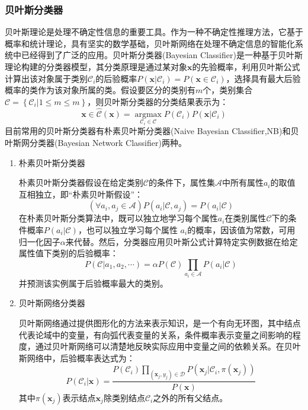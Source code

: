 \documentclass[a4paper]{ctexart}
\begin{document}
\subsubsection{贝叶斯分类器}
贝叶斯理论是处理不确定性信息的重要工具。作为一种不确定性推理方法，它基于概率和统计理论，具有坚实的数学基础，贝叶斯网络在处理不确定信息的智能化系统中已经得到了广泛的应用。贝叶斯分类器(Bayesian Classifier)是一种基于贝叶斯理论构建的分类器模型，其分类原理是通过某对象$\bm x$的先验概率，利用贝叶斯公式计算出该对象属于类别$\mathcal C_i$的后验概率$P(\bm x|\mathcal C_i)=P(\bm x\in \mathcal C_i)$，选择具有最大后验概率的类作为该对象所属的类\cite{RN199}。假设要区分的类别有$m$个，类别集合$\mathcal C=\left\{\mathcal C_i|1\leq m\leq m\right\}$，则贝叶斯分类器的分类结果表示为：
\begin{equation}
	\bm x\in \hat{\mathcal C}(\bm x)=\mathop{argmax}\limits_{\mathcal C_i\in \mathcal C}P(\mathcal C_i)P(\bm x|\mathcal C_i)
\end{equation}
目前常用的贝叶斯分类器有朴素贝叶斯分类器(Naive Bayesian Classifier,NB)和贝叶斯网分类器(Bayesian Network Classifier)两种。
\begin{enumerate}
	\item 朴素贝叶斯分类器

	      朴素贝叶斯分类器假设在给定类别$\mathcal C$的条件下，属性集$\mathcal A$中所有属性$a_i$的取值互相独立，即“朴素贝叶斯假设”\cite{RN200}：
	      \begin{equation}
		      (\forall a_i,a_j\in \mathcal A)P(a_i|\mathcal C,a_j)=P(a_i|\mathcal C)
	      \end{equation}
	      在朴素贝叶斯分类算法中，既可以独立地学习每个属性$a_i$在类别属性$\mathcal C$下的条件概率$P(a_i|\mathcal C)$，也可以独立学习每个属性 $a_i$的概率，因该值为常数，可用归一化因子$\alpha$来代替。然后，分类器应用贝叶斯公式计算特定实例数据在给定属性值下类别的后验概率\cite{RN199}\cite{RN200}\cite{RN201}：
	      \begin{equation}
		      P(\mathcal C|a_1,a_2,\cdots)=\alpha P(\mathcal C)\prod_{a_i\in\mathcal A}P(a_i|\mathcal C)
	      \end{equation}
	      并预测该实例属于后验概率最大的类别。

	\item 贝叶斯网络分类器

	      贝叶斯网络通过提供图形化的方法来表示知识，是一个有向无环图，其中结点代表论域中的变量，有向弧代表变量的关系，条件概率表示变量之间影响的程度，通过贝叶斯网络可以清楚地反映实际应用中变量之间的依赖关系。在贝叶斯网络中，后验概率表达式为\cite{RN198}：
	      \begin{equation}
		      P(\mathcal C_i|\bm x)=\frac{P(\mathcal C_i)\prod_{(\bm x_j,y_j)\in\mathcal D}P(\bm x_j|\mathcal C_i,\pi(\bm x_j))}{P(\bm x)}
	      \end{equation}
	      其中$\pi(\bm x_j)$表示结点$\bm x_j$除类别结点$\mathcal C_i$之外的所有父结点。
\end{enumerate}
\end{document}
